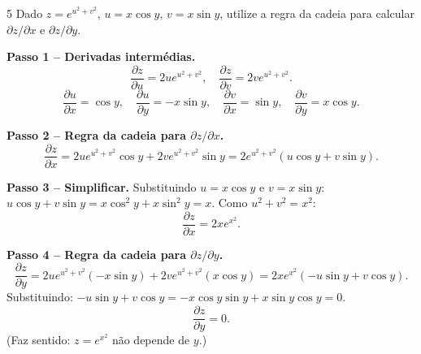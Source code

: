 \begin{exercisebox}{5}
  Dado $z = e^{u^2+v^2}$, $u = x\cos y$, $v = x\sin y$, utilize a regra
  da cadeia para calcular $\partial z/\partial x$ e $\partial z/\partial y$.
\end{exercisebox}
\begin{solbox}
  \textbf{Passo 1 -- Derivadas intermédias.}
  \[
    \frac{\partial z}{\partial u}=2ue^{u^2+v^2},\quad
    \frac{\partial z}{\partial v}=2ve^{u^2+v^2}.
  \]
  \[
    \frac{\partial u}{\partial x}=\cos y,\quad
    \frac{\partial u}{\partial y}=-x\sin y,\quad
    \frac{\partial v}{\partial x}=\sin y,\quad
    \frac{\partial v}{\partial y}=x\cos y.
  \]

  \textbf{Passo 2 -- Regra da cadeia para $\partial z/\partial x$.}
  \[
    \frac{\partial z}{\partial x}
    = 2ue^{u^2+v^2}\cos y + 2ve^{u^2+v^2}\sin y
    = 2e^{u^2+v^2}(u\cos y + v\sin y).
  \]

  \textbf{Passo 3 -- Simplificar.} Substituindo $u=x\cos y$ e $v=x\sin y$:
  $u\cos y+v\sin y = x\cos^2 y + x\sin^2 y = x$.
  Como $u^2+v^2=x^2$:
  \[
    \frac{\partial z}{\partial x} = 2xe^{x^2}.
  \]

  \textbf{Passo 4 -- Regra da cadeia para $\partial z/\partial y$.}
  \[
    \frac{\partial z}{\partial y}
    = 2ue^{u^2+v^2}(-x\sin y) + 2ve^{u^2+v^2}(x\cos y)
    = 2xe^{x^2}(-u\sin y+v\cos y).
  \]
  Substituindo: $-u\sin y+v\cos y = -x\cos y\sin y+x\sin y\cos y = 0$.
  \[
    \frac{\partial z}{\partial y} = 0.
  \]
  (Faz sentido: $z=e^{x^2}$ não depende de $y$.)
\end{solbox}

